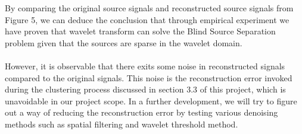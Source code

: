 \documentclass[a4paper,11pt]{article}
\begin{document}
By comparing the original source signals and reconstructed source signals from Figure 5, we can deduce the conclusion that through empirical experiment we have proven that wavelet transform can solve the Blind Source Separation problem given that the sources are sparse in the wavelet domain. \\
\\
\noindent However, it is observable that there exits some noise in reconstructed signals compared to the original signals. This noise is the reconstruction error invoked during the clustering process discussed in section 3.3 of this project, which is unavoidable in our project scope. In a further development, we will try to figure out a way of reducing the reconstruction error by testing various denoising methods such as spatial filtering and wavelet threshold method. 

\pagebreak
\end{document}

